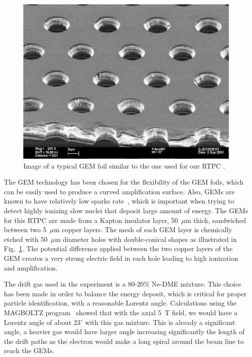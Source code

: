 \documentclass[preprint,5p]{elsarticle}
\begin{document}
\begin{figure}[tbp]
\centering
\includegraphics[scale=0.70]{fig/GEM_photo.jpg}
\caption{Image of a typical GEM foil similar to the one used for our RTPC 
\cite{GEM_ref_pic}.} 
   \label{fig:GEMs}
\end{figure}

The GEM technology has been chosen for the flexibility of the GEM foils,
which can be easily used to produce a curved amplification surface. Also, 
GEMs are known to have relatively low sparks rate~\cite{GEM_ref}, which 
is important when trying to detect 
highly ionizing slow nuclei that deposit large amount of energy. The GEMs for 
this RTPC are made from a Kapton insulator layer, 50~$\mu$m 
thick, sandwiched between two 5~$\mu$m copper layers. The mesh of each GEM 
layer is chemically etched with 50~$\mu$m diameter holes with double-conical 
shapes as illustrated in Fig.~\ref{fig:GEMs}. The potential difference 
applied between the two copper layers of the GEM creates a very strong 
electric field in each hole leading to high ionization and amplification. 

The drift gas used in the experiment is a 80-20\% Ne-DME mixture. This choice 
has been made in order to balance the energy deposit, which is critical
for proper particle identification, with a reasonable
Lorentz angle. Calculations using the MAGBOLTZ program~\cite{MAGBOLTZ} 
showed that with the axial 5~T field, we would have a Lorentz angle of 
about 23$^\circ$ with this gas mixture. This is already a significant angle,
a heavier gas would have larger angle increasing significantly
the length of the drift paths as the electron would 
make a long spiral around the beam line to reach the GEMs. 
\end{document}
